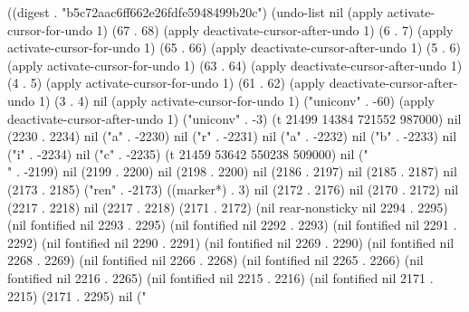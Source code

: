 
((digest . "b5c72aac6ff662e26fdfe5948499b20c") (undo-list nil (apply activate-cursor-for-undo 1) (67 . 68) (apply deactivate-cursor-after-undo 1) (6 . 7) (apply activate-cursor-for-undo 1) (65 . 66) (apply deactivate-cursor-after-undo 1) (5 . 6) (apply activate-cursor-for-undo 1) (63 . 64) (apply deactivate-cursor-after-undo 1) (4 . 5) (apply activate-cursor-for-undo 1) (61 . 62) (apply deactivate-cursor-after-undo 1) (3 . 4) nil (apply activate-cursor-for-undo 1) ("uniconv" . -60) (apply deactivate-cursor-after-undo 1) ("uniconv" . -3) (t 21499 14384 721552 987000) nil (2230 . 2234) nil ("a" . -2230) nil ("r" . -2231) nil ("a" . -2232) nil ("b" . -2233) nil ("i" . -2234) nil ("c" . -2235) (t 21459 53642 550238 509000) nil ("\\" . -2199) nil (2199 . 2200) nil (2198 . 2200) nil (2186 . 2197) nil (2185 . 2187) nil (2173 . 2185) ("ren" . -2173) ((marker*) . 3) nil (2172 . 2176) nil (2170 . 2172) nil (2217 . 2218) nil (2217 . 2218) (2171 . 2172) (nil rear-nonsticky nil 2294 . 2295) (nil fontified nil 2293 . 2295) (nil fontified nil 2292 . 2293) (nil fontified nil 2291 . 2292) (nil fontified nil 2290 . 2291) (nil fontified nil 2269 . 2290) (nil fontified nil 2268 . 2269) (nil fontified nil 2266 . 2268) (nil fontified nil 2265 . 2266) (nil fontified nil 2216 . 2265) (nil fontified nil 2215 . 2216) (nil fontified nil 2171 . 2215) (2171 . 2295) nil ("
